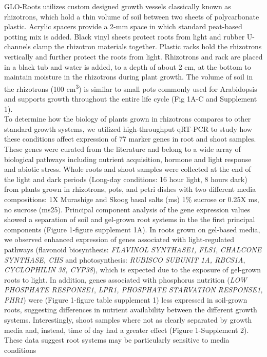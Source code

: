\documentclass[]{article}
\begin{document}
GLO-Roots utilizes custom designed growth vessels classically known as
rhizotrons, which hold a thin volume of soil between two sheets of
polycarbonate plastic. Acrylic spacers provide a 2-mm space in which
standard peat-based potting mix is added. Black vinyl sheets protect
roots from light and rubber U-channels clamp the rhizotron materials
together. Plastic racks hold the rhizotrons vertically and further
protect the roots from light. Rhizotrons and rack are placed in a black
tub and water is added, to a depth of about 2 cm, at the bottom to
maintain moisture in the rhizotrons during plant growth. The volume of
soil in the rhizotrons (100 cm\textsuperscript{3}) is similar to small
pots commonly used for Arabidopsis and supports growth throughout the
entire life cycle (Fig 1A-C and Supplement 1).\\To determine how the
biology of plants grown in rhizotrons compares to other standard growth
systems, we utilized high-throughput qRT-PCR to study how these
conditions affect expression of 77 marker genes in root and shoot
samples. These genes were curated from the literature and belong to a
wide array of biological pathways including nutrient acquisition,
hormone and light response and abiotic stress. Whole roots and shoot
samples were collected at the end of the light and dark periods
(Long-day conditions: 16 hour light, 8 hours dark) from plants grown in
rhizotrons, pots, and petri dishes with two different media
compositions: 1X Murashige and Skoog basal salts (ms) 1\% sucrose or
0.25X ms, no sucrose (ms25). Principal component analysis of the gene
expression values showed a separation of soil and gel-grown root systems
in the the first principal components (Figure 1-figure supplement 1A).
In roots grown on gel-based media, we observed enhanced expression of
genes associated with light-regulated pathways (flavonoid biosynthesis:
\emph{FLAVINOL SYNTHASE1, FLS1}, \emph{CHALCONE SYNTHASE, CHS} and
photosynthesis: \emph{RUBISCO SUBUNIT 1A, RBCS1A}, \emph{CYCLOPHILIN 38,
CYP38}), which is expected due to the exposure of gel-grown roots to
light. In addition, genes associated with phosphorus nutrition
(\emph{LOW PHOSPHATE RESPONSE1}, \emph{LPR1, PHOSPHATE STARVATION
RESPONSE1, PHR1}) were (Figure 1-figure table supplement 1) less
expressed in soil-grown roots, suggesting differences in nutrient
availability between the different growth systems. Interestingly, shoot
samples where not as clearly separated by growth media and, instead,
time of day had a greater effect (Figure 1-Supplement 2). These data
suggest root systems may be particularly sensitive to media conditions
\end{document}
